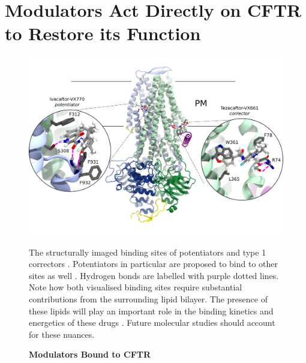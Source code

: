 
\section{Modulators Act Directly on CFTR to Restore its Function}
\begin{figure}
	\label{drugs_bound}
	\begin{center}
		\includegraphics[width=1\textwidth]{figures/drugs_bound_overall.pdf}
	\end{center}
	\captionsetup{singlelinecheck = false, justification=raggedright}
	\caption[Modulators Bound to CFTR] {\textbf{Modulators Bound to CFTR}}{The structurally imaged binding sites of potentiators and type 1 correctors \cite{liu2019, fiedorczuk2022}. Potentiators in particular are proposed to bind to other sites as well \cite{yeh2019, liu2019}. Hydrogen bonds are labelled with purple dotted lines. Note how both visualised binding sites require substantial contributions from the surrounding lipid bilayer. The presence of these lipids will play an important role in the binding kinetics and energetics of these drugs \cite{csanady2019}. Future molecular studies should account for these nuances.} 
\end{figure}

